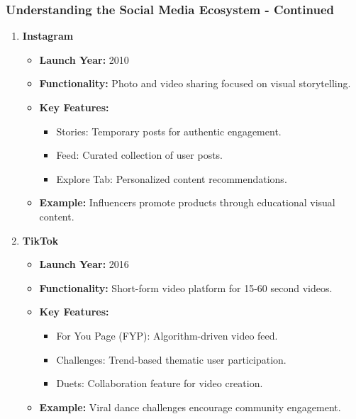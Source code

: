 \documentclass{beamer}
\begin{document}
\begin{frame}[fragile]
    \frametitle{Understanding the Social Media Ecosystem - Continued}
    \begin{enumerate}[resume]
        \item \textbf{Instagram}
            \begin{itemize}
                \item \textbf{Launch Year:} 2010
                \item \textbf{Functionality:} Photo and video sharing focused on visual storytelling.
                \item \textbf{Key Features:}
                    \begin{itemize}
                        \item Stories: Temporary posts for authentic engagement.
                        \item Feed: Curated collection of user posts.
                        \item Explore Tab: Personalized content recommendations.
                    \end{itemize}
                \item \textbf{Example:} Influencers promote products through educational visual content.
            \end{itemize}
        
        \item \textbf{TikTok}
            \begin{itemize}
                \item \textbf{Launch Year:} 2016
                \item \textbf{Functionality:} Short-form video platform for 15-60 second videos.
                \item \textbf{Key Features:}
                    \begin{itemize}
                        \item For You Page (FYP): Algorithm-driven video feed.
                        \item Challenges: Trend-based thematic user participation.
                        \item Duets: Collaboration feature for video creation.
                    \end{itemize}
                \item \textbf{Example:} Viral dance challenges encourage community engagement.
            \end{itemize}
    \end{enumerate}
\end{frame}
\end{document}
